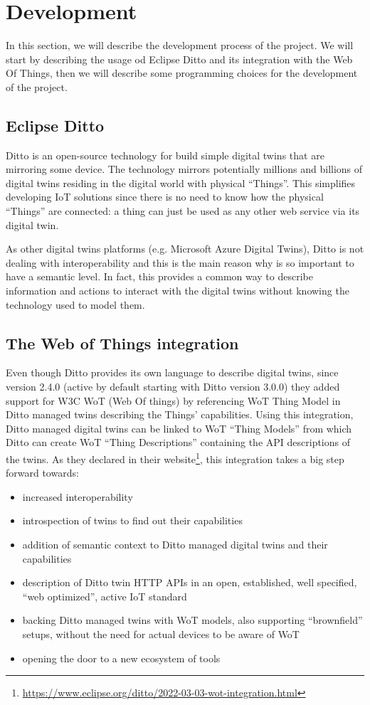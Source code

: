 \chapter{Development}
In this section, we will describe the development process of the project. We will start by describing the usage od Eclipse Ditto and its integration with the Web Of Things, then we will describe some programming choices for the development of the project.

\section{Eclipse Ditto}
Ditto is an open-source technology for build simple digital twins that are mirroring some device.
The technology mirrors potentially millions and billions of digital twins residing in the digital world with physical “Things”.
This simplifies developing IoT solutions since there is no need to know how the physical “Things” are connected:
a thing can just be used as any other web service via its digital twin.

As other digital twins platforms (e.g. Microsoft Azure Digital Twins), Ditto is not dealing with interoperability and this is the main reason why is so important to have a semantic level.
In fact, this provides a common way to describe information and actions to interact with the digital twins without knowing the technology used to model them.

\section{The Web of Things integration}
Even though Ditto provides its own language to describe digital twins, since version 2.4.0 (active by default starting with Ditto version 3.0.0) they added support for W3C WoT (Web Of things) by referencing WoT Thing Model in Ditto managed twins describing the Things' capabilities.
Using this integration, Ditto managed digital twins can be linked to WoT ``Thing Models'' from which Ditto can create WoT “Thing Descriptions” containing the API descriptions of the twins.
As they declared in their website\footnote{\url{https://www.eclipse.org/ditto/2022-03-03-wot-integration.html}}, this integration takes a big step forward towards:
\begin{itemize}
    \item increased interoperability
    \item introspection of twins to find out their capabilities
    \item addition of semantic context to Ditto managed digital twins and their capabilities
    \item description of Ditto twin HTTP APIs in an open, established, well specified, “web optimized”, active IoT standard
    \item backing Ditto managed twins with WoT models, also supporting “brownfield” setups, without the need for actual devices to be aware of WoT
    \item opening the door to a new ecosystem of tools
\end{itemize}

